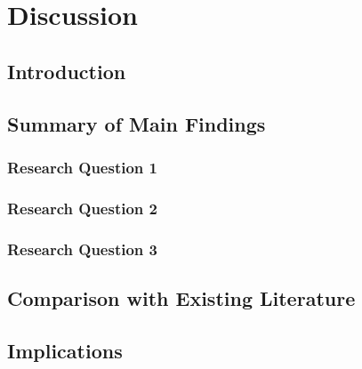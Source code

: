 \chapter{Discussion}
\label{chapter:discussion}


\section{Introduction}

\section{Summary of Main Findings}

\subsection{Research Question 1}

\subsection{Research Question 2}

\subsection{Research Question 3}

\section{Comparison with Existing Literature}

\section{Implications}

